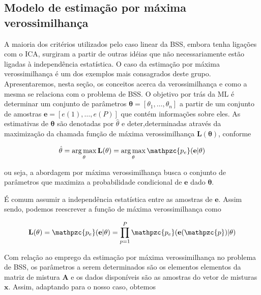     
\subsection{Modelo de estimação por máxima verossimilhança}

    A maioria dos critérios utilizados pelo caso linear da BSS, embora tenha ligações com o ICA, surgiram a partir de outras idéias que não necessariamente estão ligadas à independência estatística. O caso da estimação por máxima verossimilhança é um dos exemplos mais consagrados deste grupo. Apresentaremos, nesta seção, os conceitos acerca da verossimilhança e como a mesma se relaciona com o problema de BSS. 
    O objetivo por trás da ML é determinar um conjunto de parâmetros $\mathbf{\theta} = [\theta_1, \dots, \theta_n]$ a partir de um conjunto de amostras $\mathbf{e} = [e(1), \dots, e(P)]$ que contém informações sobre eles. As estimativas de $\mathbf{\theta}$ são denotadas por $\hat{\theta}$ e deter,determinadas através da maximização da chamada função de máxima verossimilhança $\mathbf{L(\theta)}$, conforme
    
    \begin{equation}\label{eq:argmax}
    \hat{\theta} = \operatorname*{arg\,max}_{\theta} \mathbf{L(\theta)}
    = \operatorname*{arg\,max}_{\theta}
    \mathpzc{p_e}(\mathbf{e} | \mathbf{\theta})
    \end{equation}
    
    \medskip
    
    ou seja, a abordagem por máxima verossimilhança busca o conjunto de parâmetros que maximiza a probabilidade condicional de $\mathbf{e}$ dado $\mathbf{\theta}$.
    
    É comum assumir a independência estatística entre as amostras de $\mathbf{e}$. Assim sendo, podemos reescrever a função de máxima verossimilhança como
    
    \begin{equation}\label{eq:argmax2}
        \mathbf{L(\theta)}
        =\mathpzc{p_e}(\mathbf{e} | \mathbf{\theta})
        =\prod_{p=1}^P \mathpzc{p_e}(\mathbf{e}(\mathpzc{p}) | \mathbf{\theta})
    \end{equation}

    Com relação ao emprego da estimação por máxima verossimilhança no problema de BSS, os parâmetros a serem determinados são os elementos elementos da matriz de mistura $\mathbf{A}$ e os dados disponíveis são as amostras do vetor de misturas $\mathbf{x}$. Assim, adaptando para o nosso caso, obtemos
    
